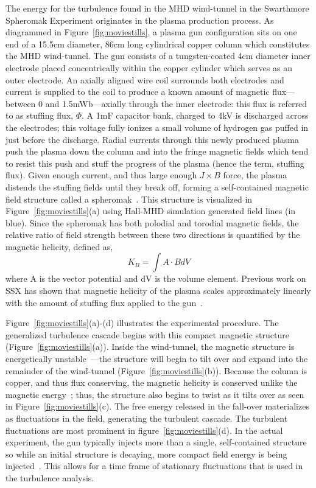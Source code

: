 \documentclass[aip,prl,amsmath,amssymb,reprint,superscriptaddress]{revtex4-1} %
\begin{document}
The energy for the turbulence found in the MHD wind-tunnel in the Swarthmore Spheromak Experiment originates in the plasma production process. As diagrammed in Figure~\ref{fig:moviestills}, a plasma gun configuration sits on one end of a 15.5cm diameter, 86cm long cylindrical copper column which constitutes the MHD wind-tunnel. The gun consists of a tungsten-coated 4cm diameter inner electrode placed concentrically within the copper cylinder which serves as an outer electrode. An axially aligned wire coil surrounds both electrodes and current is supplied to the coil to produce a known amount of magnetic flux---between 0 and 1.5mWb---axially through the inner electrode: this flux is referred to as stuffing flux, $\Phi$. A 1mF capacitor bank, charged to 4kV is discharged across the electrodes; this voltage fully ionizes a small volume of hydrogen gas puffed in just before the discharge. Radial currents through this newly produced plasma push the plasma down the column and into the fringe magnetic fields which tend to resist this push and stuff the progress of the plasma (hence the term, stuffing flux). Given enough current, and thus large enough $J\times B$ force, the plasma distends the stuffing fields until they break off, forming a self-contained magnetic field structure called a spheromak~\cite{barnes86,jarboe93}. This structure is visualized in Figure~\ref{fig:moviestills}(a) using Hall-MHD simulation generated field lines (in blue). Since the spheromak has both polodial and torodial magnetic fields, the relative ratio of field strength between these two directions is quantified by the magnetic helicity, defined as,
\begin{equation}
K_{B} = \int A \cdot B dV
\label{eq:helicity_th}
\end{equation}
where A is the vector potential and dV is the volume element. Previous work on SSX has shown that magnetic helicity of the plasma scales approximately linearly with the amount of stuffing flux applied to the gun~\cite{schaffner14b}.

Figure~\ref{fig:moviestills}(a)-(d) illustrates the experimental procedure. The generalized turbulence cascade begins with this compact magnetic structure (Figure~\ref{fig:moviestills}(a)). Inside the wind-tunnel, the magnetic structure is energetically unstable~\cite{bondeson81,jarboe93}---the structure will begin to tilt over and expand into the remainder of the wind-tunnel (Figure~\ref{fig:moviestills}(b)). Because the column is copper, and thus flux conserving, the magnetic helicity is conserved unlike the magnetic energy~\cite{taylor86}; thus, the structure also begins to twist as it tilts over as seen in Figure~\ref{fig:moviestills}(c). The free energy released in the fall-over materializes as fluctuations in the field, generating the turbulent cascade. The turbulent fluctuations are most prominent in figure~\ref{fig:moviestills}(d). In the actual experiment, the gun typically injects more than a single, self-contained structure so while an initial structure is decaying, more compact field energy is being injected~\cite{barnes86}. This allows for a time frame of stationary fluctuations that is used in the turbulence analysis.
\end{document}
